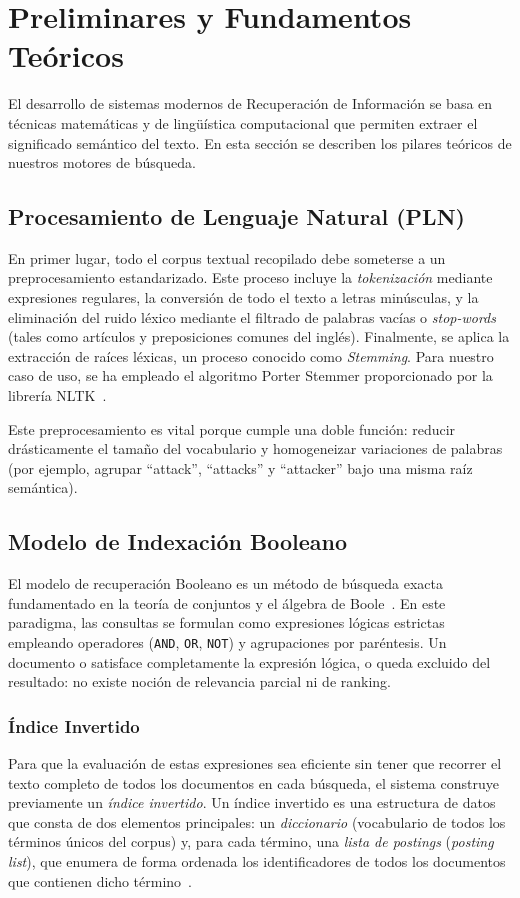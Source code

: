 \documentclass[conference,a4paper]{IEEEtran}
\begin{document}
\section{Preliminares y Fundamentos Teóricos}

El desarrollo de sistemas modernos de Recuperación de Información se basa en técnicas matemáticas y de lingüística computacional que permiten extraer el significado semántico del texto. En esta sección se describen los pilares teóricos de nuestros motores de búsqueda.

\subsection{Procesamiento de Lenguaje Natural (PLN)}

En primer lugar, todo el corpus textual recopilado debe someterse a un preprocesamiento estandarizado. Este proceso incluye la \emph{tokenización} mediante expresiones regulares, la conversión de todo el texto a letras minúsculas, y la eliminación del ruido léxico mediante el filtrado de palabras vacías o \emph{stop-words} (tales como artículos y preposiciones comunes del inglés). Finalmente, se aplica la extracción de raíces léxicas, un proceso conocido como \emph{Stemming}. Para nuestro caso de uso, se ha empleado el algoritmo Porter Stemmer proporcionado por la librería NLTK~\cite{b3}. 

Este preprocesamiento es vital porque cumple una doble función: reducir drásticamente el tamaño del vocabulario y homogeneizar variaciones de palabras (por ejemplo, agrupar ``attack'', ``attacks'' y ``attacker'' bajo una misma raíz semántica).

\subsection{Modelo de Indexación Booleano}

El modelo de recuperación Booleano es un método de búsqueda exacta fundamentado en la teoría de conjuntos y el álgebra de Boole~\cite{b4}. En este paradigma, las consultas se formulan como expresiones lógicas estrictas empleando operadores (\texttt{AND}, \texttt{OR}, \texttt{NOT}) y agrupaciones por paréntesis. Un documento o satisface completamente la expresión lógica, o queda excluido del resultado: no existe noción de relevancia parcial ni de ranking.

\subsubsection{Índice Invertido}
Para que la evaluación de estas expresiones sea eficiente sin tener que recorrer el texto completo de todos los documentos en cada búsqueda, el sistema construye previamente un \emph{índice invertido}. Un índice invertido es una estructura de datos que consta de dos elementos principales: un \emph{diccionario} (vocabulario de todos los términos únicos del corpus) y, para cada término, una \emph{lista de postings} (\emph{posting list}), que enumera de forma ordenada los identificadores de todos los documentos que contienen dicho término~\cite{b4}.
\end{document}

